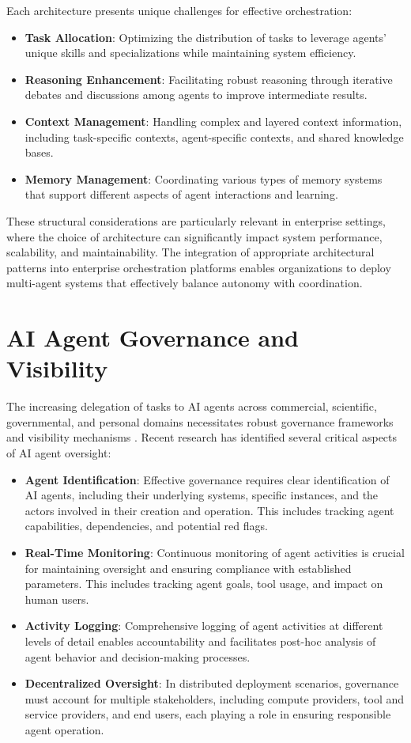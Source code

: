 \documentclass[conference]{IEEEtran}
\begin{document}
Each architecture presents unique challenges for effective orchestration:

\begin{itemize}
\item \textbf{Task Allocation}: Optimizing the distribution of tasks to leverage agents' unique skills and specializations while maintaining system efficiency.
\item \textbf{Reasoning Enhancement}: Facilitating robust reasoning through iterative debates and discussions among agents to improve intermediate results.
\item \textbf{Context Management}: Handling complex and layered context information, including task-specific contexts, agent-specific contexts, and shared knowledge bases.
\item \textbf{Memory Management}: Coordinating various types of memory systems that support different aspects of agent interactions and learning.
\end{itemize}

These structural considerations are particularly relevant in enterprise settings, where the choice of architecture can significantly impact system performance, scalability, and maintainability. The integration of appropriate architectural patterns into enterprise orchestration platforms enables organizations to deploy multi-agent systems that effectively balance autonomy with coordination.

\section{AI Agent Governance and Visibility}
The increasing delegation of tasks to AI agents across commercial, scientific, governmental, and personal domains necessitates robust governance frameworks and visibility mechanisms \cite{chan2024visibility}. Recent research has identified several critical aspects of AI agent oversight:

\begin{itemize}
\item \textbf{Agent Identification}: Effective governance requires clear identification of AI agents, including their underlying systems, specific instances, and the actors involved in their creation and operation. This includes tracking agent capabilities, dependencies, and potential red flags.
\item \textbf{Real-Time Monitoring}: Continuous monitoring of agent activities is crucial for maintaining oversight and ensuring compliance with established parameters. This includes tracking agent goals, tool usage, and impact on human users.
\item \textbf{Activity Logging}: Comprehensive logging of agent activities at different levels of detail enables accountability and facilitates post-hoc analysis of agent behavior and decision-making processes.
\item \textbf{Decentralized Oversight}: In distributed deployment scenarios, governance must account for multiple stakeholders, including compute providers, tool and service providers, and end users, each playing a role in ensuring responsible agent operation.
\end{itemize}
\end{document}
